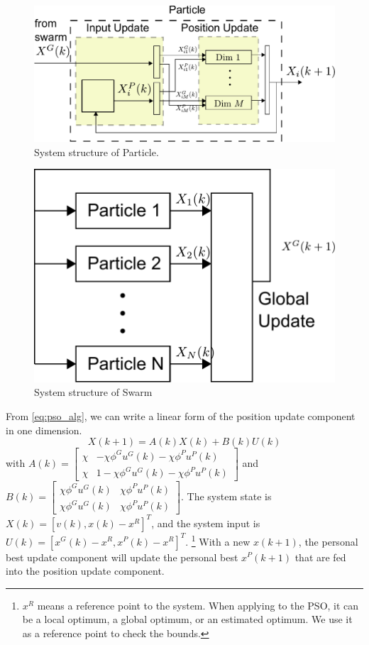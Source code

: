 \begin{figure}
\centering
\includegraphics[width=0.85\linewidth]{./fig/sys_flow.pdf}
\caption{System structure of Particle.}
\label{fig:sys_flow}
\end{figure}

\begin{figure}
\centering
\includegraphics[width=0.6\linewidth]{./fig/pso_sys_flow.pdf}
\caption{System structure of Swarm}
\label{fig:pso_sys_flow}
\end{figure}

From \eqref{eq:pso_alg}, we can write a linear form of the position update component in one dimension.
\begin{equation}
\label{eq:pso_up_linalg_simp}
X(k+1) = A(k) X(k) + B(k) U(k)
\end{equation}
with
$ A(k) = \begin{bmatrix}
\chi & - \chi \phi^{G} u^{G}(k) - \chi \phi^{P} u^{P}(k)
\\ 
\chi & 1 - \chi \phi^{G} u^{G}(k) - \chi \phi^{P} u^{P}(k)
\end{bmatrix} $
and
$ B(k) = \begin{bmatrix}
\chi \phi^{G} u^{G}(k) & \chi \phi^{P} u^{P}(k)
\\ 
\chi \phi^{G} u^{G}(k) & \chi \phi^{P} u^{P}(k)
\end{bmatrix} $.
The system state is $ X(k) = [ v(k), x(k) - x^{R} ]^{T} $, and the system input is $ U(k) = [ x^{G}(k) - x^{R} , x^{P}(k) - x^{R} ]^{T} $.
\footnote{$ x^{R} $ means a reference point to the system.
When applying to the PSO, it can be a local optimum, a global optimum, or an estimated optimum.
We use it as a reference point to check the bounds.}
With a new $ x(k+1) $, the personal best update component will update the personal best $ x^{P}(k+1) $ that are fed into the position update component.

